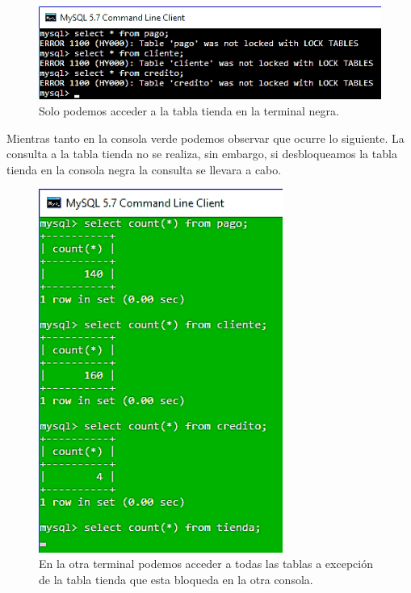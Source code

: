 \documentclass[12pt, titlepage]{article}
\begin{document}
	\begin{figure}[H]
		\begin{center}
			\includegraphics[width=\textwidth]{img/catorce.png}
			\caption{Solo podemos acceder a la tabla tienda en la terminal negra.}
			\label{fig:catorce}
		\end{center}
	\end{figure}
	
	Mientras tanto en la consola verde podemos observar que ocurre lo siguiente. La consulta a la tabla tienda no se realiza, sin embargo, si desbloqueamos la tabla tienda en la consola negra la consulta se llevara a cabo.
	
	\begin{figure}[H]
		\begin{center}
			\includegraphics[width=8cm]{img/quince.png}
			\caption{En la otra terminal podemos acceder a todas las tablas a excepción de la tabla tienda que esta bloqueda en la otra consola.}
			\label{fig:quince}
		\end{center}
	\end{figure}
	
\end{document}
